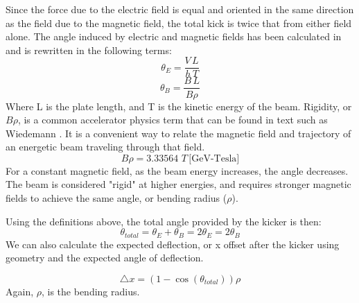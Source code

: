 Since the force due to the electric field is equal and oriented in the same direction as the field due to the magnetic field, 
the total kick is twice that from either field alone.  
The angle induced by electric and magnetic fields has been calculated in \cite{iukicker, Wiedemann}
and is rewritten in the following terms:  
\begin{equation}
\theta_E= \frac{V\,L}{h\,T}
\end{equation}
\begin{equation}
\theta_B= \frac{B\,L}{B\rho}
\end{equation}
Where L is the plate length, and T is the kinetic energy of the beam. 
Rigidity, or $B\rho$, is a common accelerator physics term that can be found in text such as Wiedemann \cite{Wiedemann}. 
It is a convenient way to relate the magnetic field and trajectory of an energetic beam traveling through that field.
\begin{equation}
	B\rho=3.33564\,\,T\, \text{[GeV-Tesla]}
\end{equation} 
For a constant magnetic field, as the beam energy increases, the angle decreases. 
The beam is considered "rigid" at higher energies, 
and requires stronger magnetic fields to achieve the same angle, or bending radius ($\rho$).

Using the definitions above, the total angle provided by the kicker is then: 
\begin{equation}
\theta_{total}= \theta_E+\theta_B=2\theta_E=2\theta_B
\end{equation}
We can also calculate the expected deflection, or x offset after the kicker 
using geometry and the expected angle of deflection. 

\begin{equation}
	\triangle x = \left(1-\cos\left(\theta_{total}\right)\right)\rho
\end{equation}
Again, $\rho$, is the bending radius. 

